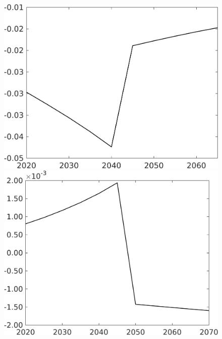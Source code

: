 \begin{figure}[h!!!]
\begin{minipage}[]{0.32\textwidth}
	\end{minipage}
	\begin{minipage}[]{0.32\textwidth}
		\includegraphics[width=1\textwidth]{../../codding_model/own_basedOnFried/optimalPol_010922_revision/figures/all_13Sept22_Tplus30/gAn_OPT_COMPtaulPer_regime4_spillover0_knspil1_noskill0_sep0_xgrowth0_PV1_etaa0.79.png}
	\end{minipage}
	\begin{minipage}[]{0.32\textwidth}
		\includegraphics[width=1\textwidth]{../../codding_model/own_basedOnFried/optimalPol_010922_revision/figures/all_13Sept22_Tplus30/SWF_OPT_COMPtaulPer_regime4_spillover0_knspil1_noskill0_sep0_xgrowth0_PV1_etaa0.79.png}
	\end{minipage}
\end{figure} 

